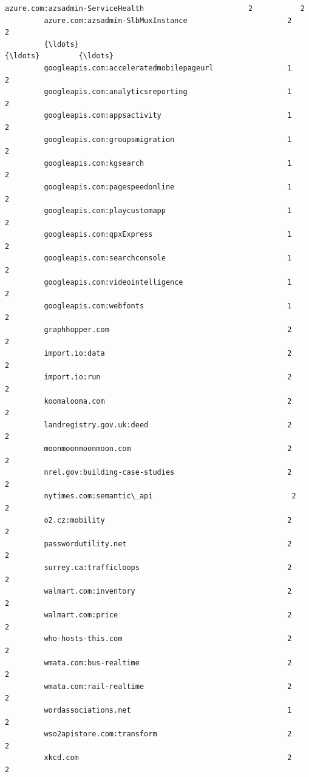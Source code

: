 \documentclass[11pt]{article}
\begin{document}
\begin{Verbatim}[commandchars=\\\{\}]
         azure.com:azsadmin-ServiceHealth                        2           2   
         azure.com:azsadmin-SlbMuxInstance                       2           2   
         {\ldots}                                                   {\ldots}         {\ldots}   
         googleapis.com:acceleratedmobilepageurl                 1           2   
         googleapis.com:analyticsreporting                       1           2   
         googleapis.com:appsactivity                             1           2   
         googleapis.com:groupsmigration                          1           2   
         googleapis.com:kgsearch                                 1           2   
         googleapis.com:pagespeedonline                          1           2   
         googleapis.com:playcustomapp                            1           2   
         googleapis.com:qpxExpress                               1           2   
         googleapis.com:searchconsole                            1           2   
         googleapis.com:videointelligence                        1           2   
         googleapis.com:webfonts                                 1           2   
         graphhopper.com                                         2           2   
         import.io:data                                          2           2   
         import.io:run                                           2           2   
         koomalooma.com                                          2           2   
         landregistry.gov.uk:deed                                2           2   
         moonmoonmoonmoon.com                                    2           2   
         nrel.gov:building-case-studies                          2           2   
         nytimes.com:semantic\_api                                2           2   
         o2.cz:mobility                                          2           2   
         passwordutility.net                                     2           2   
         surrey.ca:trafficloops                                  2           2   
         walmart.com:inventory                                   2           2   
         walmart.com:price                                       2           2   
         who-hosts-this.com                                      2           2   
         wmata.com:bus-realtime                                  2           2   
         wmata.com:rail-realtime                                 2           2   
         wordassociations.net                                    1           2   
         wso2apistore.com:transform                              2           2   
         xkcd.com                                                2           2   
         

\end{Verbatim}
\end{document}
